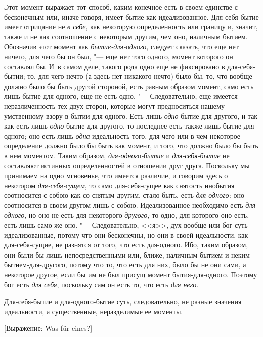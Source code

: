 Этот момент выражает тот способ, каким конечное есть в своем единстве с
бесконечным или, иначе говоря, имеет бытие как идеализованное.
Для-себя-бытие имеет отрицание не {\em в себе}, как
некоторую определенность или границу и, значит, также и не как соотношение
с некоторым другим, чем оно, наличным бытием. Обозначив этот момент как
{\em бытие-для-одного}, следует сказать, что еще нет
ничего, для чего бы он был, "--- еще нет того одного, момент которого он
составлял бы. И~в самом деле, такого рода одно еще не фиксировано в
для-себя-бытии; то, для чего нечто (а здесь нет никакого нечто) было бы,
то, что вообще должно было бы быть другой стороной, есть равным образом
момент, само есть лишь бытие-для-одного, еще не есть одно. "--- Следовательно,
еще имеется неразличенность тех двух сторон, которые могут предноситься
нашему умственному взору в бытии-для-одного. Есть лишь
{\em одно} бытие-для-другого, и так как есть лишь
{\em одно} бытие-для-другого, то последнее есть также
лишь бытие-для-одного; оно есть лишь {\em одна}
идеальность того, для чего или в чем некоторое определение должно было бы
быть как момент, и того, что должно было бы быть в нем моментом. Таким
образом, {\em для-одного-бытие} и
{\em для-себя-бытие} не составляют истинных
определенностей в отношении друг друга. Поскольку мы принимаем на одно
мгновенье, что имеется различие, и говорим здесь о некотором
{\em для-себя-сущем}, то само для-себя-сущее как
снятость инобытия соотносится с собою как со снятым другим, стало быть,
есть {\em для-одного;} оно соотносится в своем другом
лишь с собою. Идеализованное необходимо есть
{\em для-одного}, но оно не есть для некоторого
{\em другого;} то одно, для которого оно есть, есть
лишь само же оно. "--- Следовательно, <<я>>, дух вообще или бог суть
идеализованные, потому что они бесконечны, но они в своей идеальности, как
для-себя-сущие, не разнятся от того, что есть для-одного. Ибо, таким
образом, они были бы лишь непосредственными или, ближе, наличным бытием и
неким бытием-для-другого, потому что то, что есть для них, было бы не они
сами, а некоторое другое, если бы им не был присущ момент бытия-для-одного.
Поэтому бог есть {\em для себя}, поскольку сам он есть
то, что есть {\em для него}.

Для-себя-бытие и для-одного-бытие суть, следовательно, не разные значения
идеальности, а существенные, неразделимые ее моменты.

%
{[Выражение: Was für eines?]}

